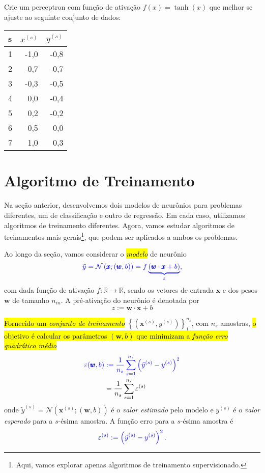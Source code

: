 \begin{exer}
  Crie um perceptron com função de ativação $f(x)=\tanh(x)$ que melhor se ajuste ao seguinte conjunto de dados:
  \begin{center}
  \begin{tabular}{l|rr}
    s & $x^{(s)}$ & $y^{(s)}$\\\hline
    1 & -1,0 & -0,8 \\
    2 & -0,7 & -0,7 \\
    3 & -0,3 & -0,5 \\
    4 &  0,0 & -0,4 \\
    5 &  0,2 & -0,2 \\
    6 &  0,5 &  0,0 \\
    7 &  1,0 &  0,3 \\\hline
  \end{tabular}
\end{center}
\end{exer}

\section{Algoritmo de Treinamento}\label{cap_percepton_sec_train}

Na seção anterior, desenvolvemos dois modelos de neurônios para problemas diferentes, um de classificação e outro de regressão. Em cada caso, utilizamos algoritmos de treinamento diferentes. Agora, vamos estudar algoritmos de treinamentos mais gerais\footnote{Aqui, vamos explorar apenas algoritmos de treinamento supervisionado.}, que podem ser aplicados a ambos os problemas.

Ao longo da seção, vamos considerar o \hl{\emph{modelo}} de neurônio
\begin{equation}
  \color{blue}\tilde{y} = \mathcal{N}\left(\pmb{x}; (\pmb{w}, b)\right) = f\underbrace{(\pmb{w}\cdot\pmb{x} + b)}_{z},
\end{equation}
com dada função de ativação $f:\mathbb{R}\to\mathbb{R}$, sendo os vetores de entrada $\pmb{x}$ e dos pesos $\pmb{w}$ de tamanho $n_{in}$. A pré-ativação do neurônio é denotada por
\begin{equation}
  z := \pmb{w}\cdot\pmb{x} + b
\end{equation}

\hl{Fornecido um \emph{conjunto de treinamento}} $\left\{\left(\pmb{x}^{(s)}, y^{(s)}\right)\right\}_1^{n_s}$, com $n_s$ amostras, \hl{o objetivo é calcular os parâmetros $(\pmb{w}, b)$ que minimizam a \emph{função erro quadrático médio}}
\begin{align}\label{eq:percep_mse}
  \color{blue}\varepsilon(\pmb{w}, b) &\color{blue}:= \frac{1}{n_s}\sum_{s=1}^{n_s}\left(\tilde{y}^{(s)} - y^{(s)}\right)^2\\
                          &= \frac{1}{n_s}\sum_{s=1}^{n_s}\varepsilon^{(s)}
\end{align}
onde $\tilde{y}^{(s)} = \mathcal{N}\left(\pmb{x}^{(s)}; (\pmb{w}, b)\right)$ é o \emph{valor estimado} pelo modelo e $y^{(s)}$ é o \emph{valor esperado} para a $s$-ésima amostra. A função erro para a $s$-ésima amostra é
\begin{equation}\color{blue}\varepsilon^{(s)} := \left(\tilde{y}^{(s)} - y^{(s)}\right)^2.
\end{equation}

